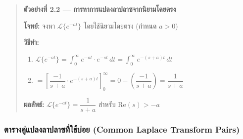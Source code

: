 \begin{quote}
\textbf{ตัวอย่างที่ 2.2 --- การหาการแปลงลาปลาซจากนิยามโดยตรง}

\textbf{โจทย์:} จงหา \(\mathcal{L}\{e^{-at}\}\) โดยใช้นิยามโดยตรง (กำหนด
\(a > 0\))

\textbf{วิธีทำ:}

\begin{enumerate}
\def\labelenumi{\arabic{enumi}.}
\tightlist
\item
  \(\mathcal{L}\{e^{-at}\} = \displaystyle\int_0^{\infty} e^{-at}\cdot e^{-st}\,dt = \int_0^{\infty} e^{-(s+a)t}\,dt\)
\item
  \(= \left[\dfrac{-1}{s+a}\cdot e^{-(s+a)t}\right]_0^{\infty} = 0 - \left(\dfrac{-1}{s+a}\right) = \dfrac{1}{s+a}\)
\end{enumerate}

\textbf{ผลลัพธ์:} \(\mathcal{L}\{e^{-at}\} = \dfrac{1}{s+a}\) สำหรับ
\(\text{Re}(s) > -a\)
\end{quote}

\subsubsection{ตารางคู่แปลงลาปลาซที่ใช้บ่อย (Common Laplace Transform
Pairs)}\label{uxe15uxe32uxe23uxe32uxe07uxe04uxe41uxe1buxe25uxe07uxe25uxe32uxe1buxe25uxe32uxe0buxe17uxe43uxe0auxe1auxe2duxe22-common-laplace-transform-pairs}

